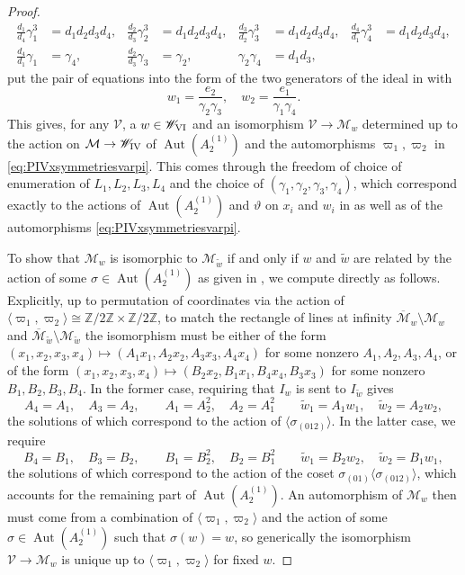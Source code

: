 \documentclass[a4paper,reqno]{amsart}
\numberwithin{equation}{section}
\newcommand{\Z}{\mathbb{Z}}
\DeclareMathOperator{\Aut}{Aut}
\numberwithin{equation}{section}
\begin{document}
\begin{proof}
$$
\begin{aligned}\frac{d_1}{d_4}\gamma_1^3&=d_1d_2d_3d_4, & 
\frac{d_2}{d_3}\gamma_2^3&=d_1d_2d_3d_4, &
\frac{d_3}{d_2}\gamma_3^3&=d_1d_2d_3d_4, &
\frac{d_4}{d_1}\gamma_4^3&=d_1d_2d_3d_4,\\
\frac{d_4}{d_1}\gamma_1&=\gamma_4, & \frac{d_2}{d_3}\gamma_3&=\gamma_2, & \gamma_2\gamma_4&=d_1d_3, & &
\end{aligned}$$
put the pair of equations into the form 
of the two generators of the ideal in  
with 
$$w_1 = \frac{e_2}{\gamma_2\gamma_3}, \quad 
w_2 = \frac{e_1}{\gamma_1\gamma_4}.$$
This gives, for any $\mathcal{V}$, a $w \in \mathscr{W}_{\rm VI}$ and an isomorphism $\mathcal{V}\to \mathcal{M}_w$ determined up to the action on $\mathcal{M}\to \mathscr{W}_{\rm{IV}}$ of $\Aut(A_2^{(1)})$ and the automorphisms $\varpi_1,\varpi_2$ in \eqref{eq:PIVxsymmetriesvarpi}. 
This comes through the freedom of choice of enumeration of $L_1,L_2,L_3,L_4$ and the choice of $(\gamma_1,\gamma_2,\gamma_3,\gamma_4)$, which correspond exactly to the actions of $\operatorname{Aut}(A_2^{(1)})$ and $\vartheta$ on $x_i$ and $w_i$ in  as well as of the automorphisms \eqref{eq:PIVxsymmetriesvarpi}.

To show that $\mathcal{M}_w$ is isomorphic to $\mathcal{M}_{\tilde{w}}$ if and only if $w$ and $\tilde{w}$ are related by the action of some $\sigma\in \Aut(A_2^{(1)})$ as given in , we compute directly as follows. 
Explicitly, up to permutation of coordinates via the action of $\langle \varpi_1,\varpi_2\rangle \cong \Z/2\Z\times\Z/2\Z$, to match the rectangle of lines at infinity $\overline{\mathcal{M}}_{w}\setminus \mathcal{M}_{w}$ and $\overline{\mathcal{M}}_{\tilde{w}}\setminus \mathcal{M}_{\tilde{w}}$ the isomorphism must be either of the form $(x_1,x_2,x_3,x_4)\mapsto (A_1 x_1,A_2 x_2, A_3x_3, A_4x_4)$ for some nonzero $A_1,A_2,A_3,A_4$, or of the form $(x_1,x_2,x_3,x_4)\mapsto (B_2 x_2,B_1 x_1, B_4x_4, B_3x_3)$ for some nonzero $B_1,B_2,B_3,B_4$. 
In the former case, requiring that $I_w$ is sent to $I_{\tilde{w}}$ gives 
\begin{equation*}
    A_4=A_1,\quad A_3=A_2, \qquad A_1=A_2^2,\quad A_2=A_1^2\qquad \tilde{w}_1 = A_1 w_1, \quad \tilde{w}_2 = A_2 w_2, 
\end{equation*}
the solutions of which correspond to the action of $\langle \sigma_{(012)}\rangle$.
In the latter case, we require 
\begin{equation*}
    B_4=B_1,\quad B_3=B_2, \qquad B_1=B_2^2,\quad B_2=B_1^2\qquad \tilde{w}_1 = B_2 w_2, \quad \tilde{w}_2 = B_1 w_1, 
\end{equation*}
the solutions of which correspond to the action of the coset $\sigma_{(01)}\langle \sigma_{(012)}\rangle$, which accounts for the remaining part of $\operatorname{Aut}(A_2^{(1)})$.
An automorphism of $\mathcal{M}_w$ then must come from a combination of $\langle \varpi_1,\varpi_2\rangle$ and the action of some $\sigma \in \Aut(A_2^{(1)})$ such that $\sigma(w)=w$, so generically the isomorphism $\mathcal{V}\to \mathcal{M}_w$ is unique up to $\langle \varpi_1,\varpi_2\rangle$ for fixed $w$.
\end{proof}
\end{document}
